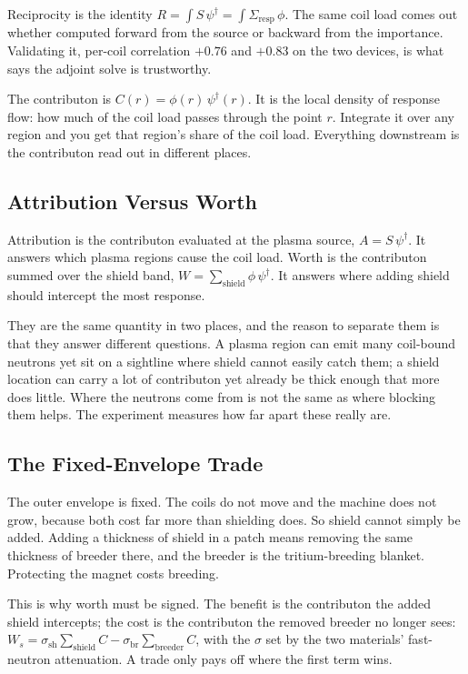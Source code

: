 \documentclass[11pt]{article}
\begin{document}
Reciprocity is the identity $R=\int S\,\psi^\dagger = \int \Sigma_{\mathrm{resp}}\,\phi$. The same
coil load comes out whether computed forward from the source or backward from the importance.
Validating it, per-coil correlation $+0.76$ and $+0.83$ on the two devices, is what says the adjoint
solve is trustworthy.

The contributon is $C(r)=\phi(r)\,\psi^\dagger(r)$. It is the local density of response flow: how
much of the coil load passes through the point $r$. Integrate it over any region and you get that
region's share of the coil load. Everything downstream is the contributon read out in different
places.

\subsection{Attribution Versus Worth}
Attribution is the contributon evaluated at the plasma source, $A=S\,\psi^\dagger$. It answers which
plasma regions cause the coil load. Worth is the contributon summed over the shield band,
$W=\sum_{\mathrm{shield}}\phi\,\psi^\dagger$. It answers where adding shield should intercept the most
response.

They are the same quantity in two places, and the reason to separate them is that they answer
different questions. A plasma region can emit many coil-bound neutrons yet sit on a sightline where
shield cannot easily catch them; a shield location can carry a lot of contributon yet already be
thick enough that more does little. Where the neutrons come from is not the same as where blocking
them helps. The experiment measures how far apart these really are.

\subsection{The Fixed-Envelope Trade}
The outer envelope is fixed. The coils do not move and the machine does not grow, because both cost
far more than shielding does. So shield cannot simply be added. Adding a thickness of shield in a
patch means removing the same thickness of breeder there, and the breeder is the tritium-breeding
blanket. Protecting the magnet costs breeding.

This is why worth must be signed. The benefit is the contributon the added shield intercepts; the
cost is the contributon the removed breeder no longer sees:
$W_s=\sigma_{\mathrm{sh}}\sum_{\mathrm{shield}}C-\sigma_{\mathrm{br}}\sum_{\mathrm{breeder}}C$, with
the $\sigma$ set by the two materials' fast-neutron attenuation. A trade only pays off where the
first term wins.
\end{document}
